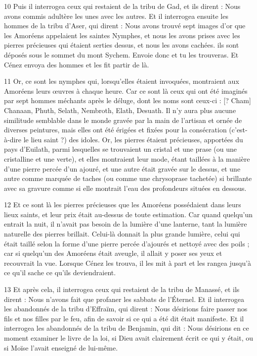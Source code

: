 \par 10 Puis il interrogea ceux qui restaient de la tribu de Gad, et ils dirent : Nous avons commis adultère les unes avec les autres. Et il interrogea ensuite les hommes de la tribu d'Aser, qui dirent : Nous avons trouvé sept images d'or que les Amoréens appelaient les saintes Nymphes, et nous les avons prises avec les pierres précieuses qui étaient serties dessus, et nous les avons cachées. ils sont déposés sous le sommet du mont Sychem. Envoie donc et tu les trouveras. Et Cénez envoya des hommes et les fit partir de là.

\par 11 Or, ce sont les nymphes qui, lorsqu'elles étaient invoquées, montraient aux Amoréens leurs œuvres à chaque heure. Car ce sont là ceux qui ont été imaginés par sept hommes méchants après le déluge, dont les noms sont ceux-ci : [? Cham] Chanaan, Phuth, Selath, Nembroth, Elath, Desuath. Il n'y aura plus aucune similitude semblable dans le monde gravée par la main de l'artisan et ornée de diverses peintures, mais elles ont été érigées et fixées pour la consécration (c'est-à-dire le lieu saint ?) des idoles. Or, les pierres étaient précieuses, apportées du pays d'Euilath, parmi lesquelles se trouvaient un cristal et une prase (ou une cristalline et une verte), et elles montraient leur mode, étant taillées à la manière d'une pierre percée d'un ajouré, et une autre était gravée sur le dessus, et une autre comme marquée de taches (ou comme une chrysoprase tachetée) si brillante avec sa gravure comme si elle montrait l'eau des profondeurs situées en dessous.

\par 12 Et ce sont là les pierres précieuses que les Amoréens possédaient dans leurs lieux saints, et leur prix était au-dessus de toute estimation. Car quand quelqu'un entrait la nuit, il n'avait pas besoin de la lumière d'une lanterne, tant la lumière naturelle des pierres brillait. Celui-là donnait la plus grande lumière, celui qui était taillé selon la forme d'une pierre percée d'ajourés et nettoyé avec des poils ; car si quelqu'un des Amoréens était aveugle, il allait y poser ses yeux et recouvrait la vue. Lorsque Cénez les trouva, il les mit à part et les rangea jusqu'à ce qu'il sache ce qu'ils deviendraient.

\par 13 Et après cela, il interrogea ceux qui restaient de la tribu de Manassé, et ils dirent : Nous n'avons fait que profaner les sabbats de l'Éternel. Et il interrogea les abandonnés de la tribu d'Effraïm, qui dirent : Nous désirions faire passer nos fils et nos filles par le feu, afin de savoir si ce qui a été dit était manifeste. Et il interrogea les abandonnés de la tribu de Benjamin, qui dit : Nous désirions en ce moment examiner le livre de la loi, si Dieu avait clairement écrit ce qui y était, ou si Moïse l'avait enseigné de lui-même.

